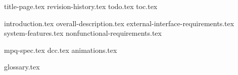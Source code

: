 \documentclass[oneside, openany]{scrbook}
\begin{document}
\frontmatter
{title-page.tex}
{revision-history.tex}
{todo.tex}
{toc.tex} %

\mainmatter
{introduction.tex}
{overall-description.tex}
{external-interface-requirements.tex}
{system-features.tex}
{nonfunctional-requirements.tex}

\begin{appendices}
	{mpq-spec.tex}
	{dcc.tex}
	{animations.tex}
\end{appendices}

\backmatter
{glossary.tex}
\end{document}
